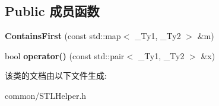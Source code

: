 \subsection*{Public 成员函数}
\begin{DoxyCompactItemize}
\item 
\hypertarget{class_contains_first_a06a75fc33bfef756e9ecb73b3dfbf483}{{\bfseries Contains\+First} (const std\+::map$<$ \+\_\+\+Ty1, \+\_\+\+Ty2 $>$ \&m)}\label{class_contains_first_a06a75fc33bfef756e9ecb73b3dfbf483}

\item 
\hypertarget{class_contains_first_a87c92bb6c19e67ede148244777866588}{bool {\bfseries operator()} (const std\+::pair$<$ \+\_\+\+Ty1, \+\_\+\+Ty2 $>$ \&x)}\label{class_contains_first_a87c92bb6c19e67ede148244777866588}

\end{DoxyCompactItemize}


该类的文档由以下文件生成\+:\begin{DoxyCompactItemize}
\item 
common/S\+T\+L\+Helper.\+h\end{DoxyCompactItemize}
